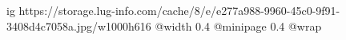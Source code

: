  
 
 
 
 

\ifcmt
  ig https://storage.lug-info.com/cache/8/e/e277a988-9960-45c0-9f91-3408d4c7058a.jpg/w1000h616
  @width 0.4
  @minipage 0.4
  @wrap \parpic[r]
\fi
